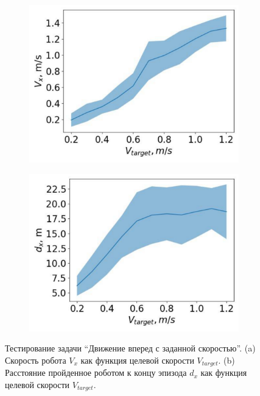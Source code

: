 \begin{figure}[h]
\begin{subfigure}{.5\textwidth}
  \centering
  \includegraphics[width=1\textwidth]{images/vx}
\end{subfigure}%
\begin{subfigure}{.5\textwidth}
  \centering
  \includegraphics[width=1\textwidth]{images/dx}
\end{subfigure}%
\caption{Тестирование задачи ``Движение вперед с заданной скоростью''. (a) Скорость робота $V_x$ как функция целевой скорости $V_{target}$. (b) Расстояние пройденное роботом к концу эпизода $d_x$ как функция целевой скорости $V_{target}$.}
\label{fig:unitree_eval_forward}
\end{figure}

